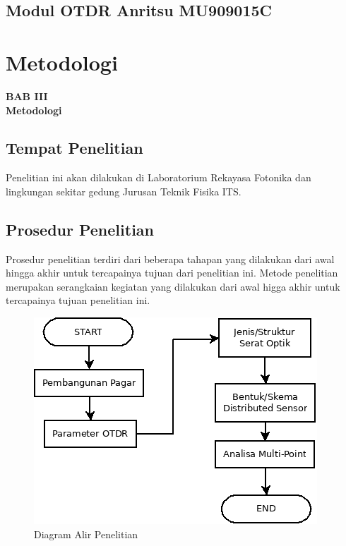 \documentclass[12pt]{article}
\begin{document}
	\subsection{Modul OTDR Anritsu MU909015C}
	

\newpage
\thispagestyle{plain}
\mbox{}


\newpage

	\setcounter{figure}{0}

	\section{Metodologi}
	
	\begin{center}
		{\large \textbf{BAB III}} \\
		{\large \textbf{Metodologi}}
	\end{center}
	
	\subsection{Tempat  Penelitian}
	
	Penelitian ini akan dilakukan di Laboratorium Rekayasa Fotonika dan lingkungan sekitar gedung Jurusan Teknik Fisika ITS.
	
	\subsection{Prosedur Penelitian}
	
	Prosedur penelitian terdiri dari beberapa tahapan yang dilakukan dari awal hingga akhir untuk tercapainya tujuan dari penelitian ini.
	Metode penelitian merupakan serangkaian kegiatan yang dilakukan dari awal higga akhir untuk tercapainya tujuan penelitian ini.
	
	\begin{figure}[h!]
		\centering
		\captionsetup{justification=centering}
		\includegraphics[width=0.5\linewidth]{images/Bab_3/Bab_3_1}
		\caption[Diagram Alir Penelitian]{\small{Diagram Alir Penelitian}}
	\end{figure}
\end{document}
